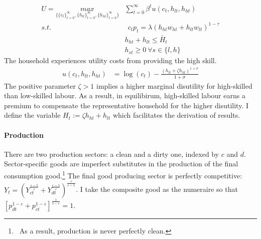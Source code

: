 \begin{align}
U=\underset{\{\{c_{t}\}_{t=0}^{\infty}, \{h_{lt}\}_{t=0}^{\infty}, \{h_{ht}\}_{t=0}^{\infty}\}}{max}&
\sum_{t=0}^{\infty}\beta^t u(c_{t}, h_{lt}, h_{ht})\\
s.t.& \ \ c_{t}p_{t}=%
\lambda \left(h_{ht}w_{ht}+h_{lt}w_{lt}\right)^{1-\tau}\\
\ & h_{ht}+h_{lt}\leq \bar{H}_t\\
\ & h_{st}\geq 0 \ \forall s\in \{l,h\}
\end{align}
The household experiences utility costs from  providing the high skill.
\begin{align}
	u(c_{t}, h_{lt}, h_{ht})&= %
	\log(c_t)-\frac{(h_{lt}+\zeta h_{ht})^{1+\sigma}}{1+\sigma}%
\end{align}
The positive parameter $\zeta>1$ implies a higher marginal disutility for high-skilled than low-skilled labour. As a result, in equilibirum,  
high-skilled labour earns a premium to compensate the representative household for the higher disutility. %
I define the variable $H_t:=\zeta h_{ht}+h_{lt}$ which facilitates the derivation of results. 

\paragraph{Production}
There are two production sectors: a clean and a dirty one, indexed by $c$ and $d$. Sector-specific goods are imperfect substitutes in the production of the final consumption good.\footnote{\ As a result, production is never perfectly clean.}  
The final good producing sector is perfectly competitive:
$Y_t=\left(Y_{ct}^{\frac{\varepsilon-1}{\varepsilon}}+Y_{dt}^{\frac{\varepsilon-1}{\varepsilon}}\right)^\frac{\varepsilon}{\varepsilon-1}$. 
I take the composite good as the numeraire so that $\left[p_{dt}^{1-\varepsilon}+p_{ct}^{1-\varepsilon}\right]^{\frac{1}{1-\varepsilon}}=1$.

